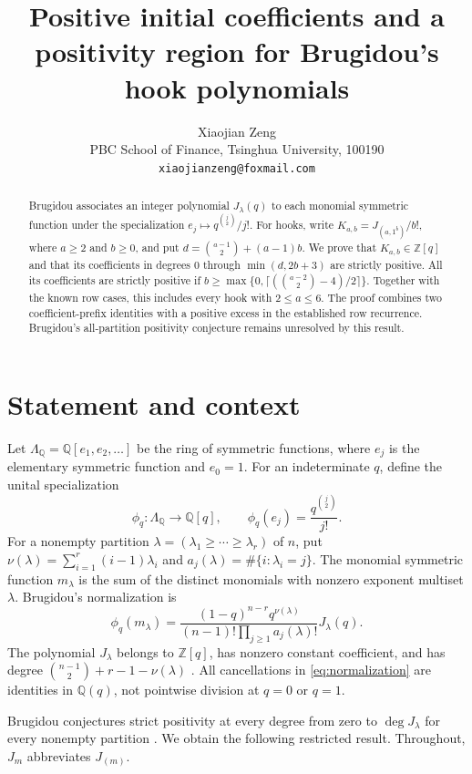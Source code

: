 \documentclass[11pt]{article}
\title{Positive initial coefficients and a positivity region\newline
for Brugidou's hook polynomials}
\author{Xiaojian Zeng\\[3pt]
\small PBC School of Finance, Tsinghua University, 100190\\
\small\texttt{xiaojianzeng@foxmail.com}}
\date{}
\newcommand{\Q}{\mathbb Q}
\newcommand{\Z}{\mathbb Z}
\begin{document}
\maketitle
\begin{abstract}
Brugidou associates an integer polynomial $J_\lambda(q)$ to each monomial
symmetric function under the specialization $e_j\mapsto q^{\binom j2}/j!$.
For hooks, write $K_{a,b}=J_{(a,1^b)}/b!$, where $a\geq2$ and $b\geq0$,
and put $d=\binom{a-1}{2}+(a-1)b$. We prove that $K_{a,b}\in\Z[q]$ and
that its coefficients in degrees $0$ through $\min(d,2b+3)$ are strictly
positive. All its coefficients are strictly positive if
$b\geq\max\{0,\lceil(\binom{a-2}{2}-4)/2\rceil\}$.
Together with the known row cases, this includes every hook with
$2\leq a\leq6$. The proof combines two coefficient-prefix identities with
a positive excess in the established row recurrence. Brugidou's
all-partition positivity conjecture remains unresolved by this result.
\end{abstract}

\section{Statement and context}

Let $\Lambda_{\Q}=\Q[e_1,e_2,\ldots]$ be the ring of symmetric functions,
where $e_j$ is the elementary symmetric function and $e_0=1$. For an
indeterminate $q$, define the unital specialization
\[
 \phi_q:\Lambda_{\Q}\longrightarrow\Q[q],\qquad
 \phi_q(e_j)=\frac{q^{\binom j2}}{j!}.
\]
For a nonempty partition $\lambda=(\lambda_1\geq\cdots\geq\lambda_r)$ of
$n$, put $\nu(\lambda)=\sum_{i=1}^r(i-1)\lambda_i$ and
$a_j(\lambda)=\#\{i:\lambda_i=j\}$. The monomial symmetric function
$m_\lambda$ is the sum of the distinct monomials with nonzero exponent
multiset $\lambda$. Brugidou's normalization is
\begin{equation}\label{eq:normalization}
 \phi_q(m_\lambda)=
 \frac{(1-q)^{n-r}q^{\nu(\lambda)}}{(n-1)!\prod_{j\geq1}a_j(\lambda)!}
 J_\lambda(q).
\end{equation}
The polynomial $J_\lambda$ belongs to $\Z[q]$, has nonzero constant
coefficient, and has degree
$\binom{n-1}{2}+r-1-\nu(\lambda)$
\cite[Corollary~3.5]{BrugidouMonomial}. All cancellations in
\eqref{eq:normalization} are identities in $\Q(q)$, not pointwise division
at $q=0$ or $q=1$.

Brugidou conjectures strict positivity at every degree from zero to
$\deg J_\lambda$ for every nonempty partition
\cite[Conjecture~4.1]{BrugidouMonomial}. We obtain the following restricted
result. Throughout, $J_m$ abbreviates $J_{(m)}$.
\end{document}
